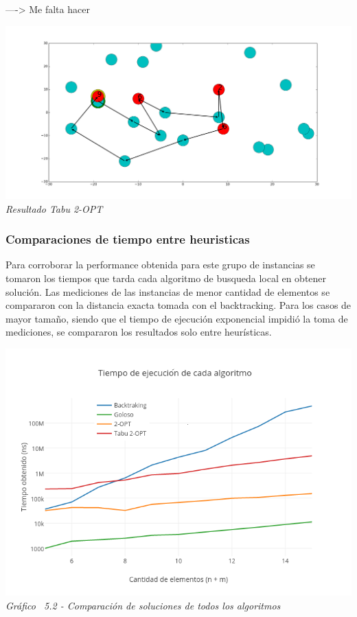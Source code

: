     ----> Me falta hacer
    \vspace*{0.3cm} \vspace*{0.3cm}
  \begin{center}
\includegraphics[scale=0.3]{./EJ5/caminoEj3opt.png}
\\{\textit{Resultado Tabu 2-OPT}}
  \end{center}
  \vspace*{0.3cm}


\subsubsection{Comparaciones de tiempo entre heuristicas}

Para corroborar la performance obtenida para este grupo de instancias se tomaron los tiempos que tarda cada algoritmo de busqueda local en obtener soluci\'on. 
 Las mediciones de las instancias de menor cantidad de elementos se compararon con la distancia exacta tomada con el backtracking. Para los casos de mayor tamaño, siendo que el tiempo de ejecución exponencial impidió la toma de mediciones, se compararon los resultados solo entre heurísticas.


\vspace*{0.3cm} \vspace*{0.3cm}
  \begin{center}
 \includegraphics[scale=0.5]{./EJ5/medicionTodos.png}\\
 {\textit{Gráfico \ 5.2 - Comparaci\'on de soluciones de todos los algoritmos}}
  \end{center}
  \vspace*{0.3cm}

